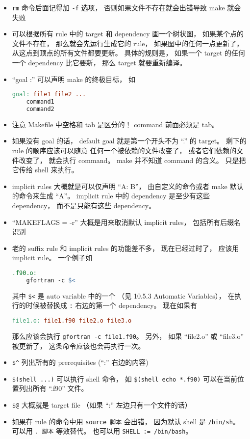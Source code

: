 \begin{itemize}
\item \verb|rm| 命令后面记得加 \verb|-f| 选项， 否则如果文件不存在就会出错导致 make 就会失败
\item 可以根据所有 rule 中的 target 和 dependency 画一个树状图， 如果某个点的文件不存在， 那么就会先运行生成它的 rule， 如果图中的任何一点更新了， 从这点到顶点的所有文件都要更新。 具体的规则是， 如果一个 target 的任何一个 dependency 比它要新， 那么 target 就要重新编译。
\item “goal :” 可以声明 make 的终极目标， 如
\begin{lstlisting}[language=makefile]
goal: file1 file2 ...
	command1
	command2
\end{lstlisting}
\item 注意 Makefile 中空格和 tab 是区分的！ command 前面必须是 tab。
\item 如果没有 goal 的话， default goal 就是第一个开头不为 “.” 的 target。 剩下的 rule 的顺序应该可以随意
任何一个被依赖的文件改变了， 或者它们依赖的文件改变了， 就会执行 command。 make 并不知道 command 的含义。 只是把它传给 shell 来执行。
\item implicit rules 大概就是可以仅声明 “A: B”， 由自定义的命令或者 make 默认的命令来生成 “A”。 implicit rule 中的 dependency 是至少有这些 dependency， 而不是只能有这些 dependency。
\item “MAKEFLAGS = -r” 大概是用来取消默认 implicit rules， 包括所有后缀名识别
\item 老的 suffix rule 和 implicit rules 的功能差不多， 现在已经过时了， 应该用 implicit rule。 一个例子如
\begin{lstlisting}[language=makefile]
.f90.o:
	gfortran -c $<
\end{lstlisting}
其中 \verb|$<| 是 auto variable 中的一个 （见 10.5.3 Automatic Variables）， 在执行的时候被替换成 \verb|:| 右边的第一个 dependency。 现在如果有
\begin{lstlisting}[language=makefile]
file1.o: file1.f90 file2.o file3.o
\end{lstlisting}
那么应该会执行 \verb|gfortran -c file1.f90|。 另外， 如果 “file2.o” 或 “file3.o” 被更新了， 这条命令应该也会再执行一次。
\item \verb|$^| 列出所有的 prerequisites (“:” 右边的内容)
\item \verb|$(shell ...)| 可以执行 shell 命令， 如 \verb|$(shell echo *.f90)| 可以在当前位置列出所有 “.f90” 文件。
\item \verb|$@| 大概就是 target file （如果 “:” 左边只有一个文件的话）
\item 如果在 rule 的命令中用 \verb|source 脚本| 会出错， 因为默认 shell 是 \verb|/bin/sh|。 可以用 \verb|. 脚本| 等效替代。 也可以用 \verb|SHELL := /bin/bash|。

\end{itemize}
